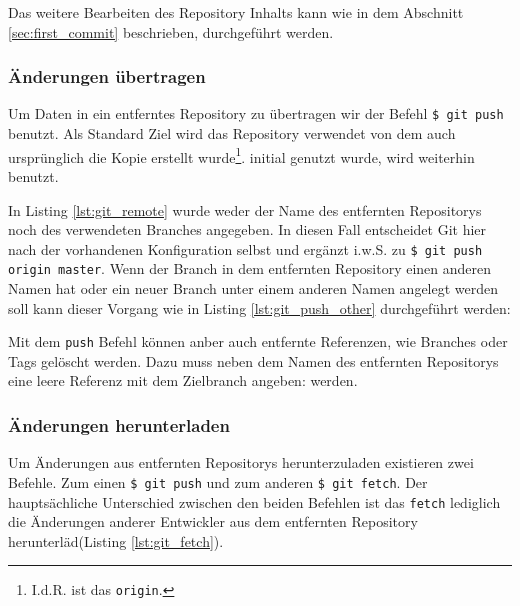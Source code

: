 Das weitere Bearbeiten des Repository Inhalts kann wie in dem Abschnitt
\ref{sec:first_commit} beschrieben, durchgeführt werden.

\subsubsection{Änderungen übertragen}
Um Daten in ein entferntes Repository zu übertragen wir der Befehl \texttt{\$
git push} benutzt. Als Standard Ziel wird das Repository verwendet von dem auch
ursprünglich die Kopie erstellt wurde\footnote{I.d.R. ist das \texttt{origin}.}.
initial genutzt wurde, wird weiterhin benutzt.



In Listing \ref{lst:git_remote} wurde weder der Name des entfernten Repositorys
noch des verwendeten Branches angegeben. In diesen Fall entscheidet Git hier
nach der vorhandenen Konfiguration selbst und ergänzt i.w.S. zu \texttt{\$ git
push origin master}. Wenn der Branch in dem entfernten Repository einen anderen
Namen hat oder ein neuer Branch unter einem anderen Namen angelegt werden soll
kann dieser Vorgang wie in Listing \ref{lst:git_push_other} durchgeführt werden:



Mit dem \texttt{push} Befehl können anber auch entfernte Referenzen, wie
Branches oder Tags gelöscht werden. Dazu muss neben dem Namen des entfernten
Repositorys eine leere Referenz mit dem Zielbranch angeben:
werden.\cite[S.~153-155]{gitosp}



\subsubsection{Änderungen herunterladen}
Um Änderungen aus entfernten Repositorys herunterzuladen existieren zwei
Befehle. Zum einen \texttt{\$ git push} und zum anderen \texttt{\$ git fetch}.
Der hauptsächliche Unterschied zwischen den beiden Befehlen ist das
\texttt{fetch} lediglich die Änderungen anderer Entwickler aus dem entfernten
Repository herunterläd(Listing \ref{lst:git_fetch}).



